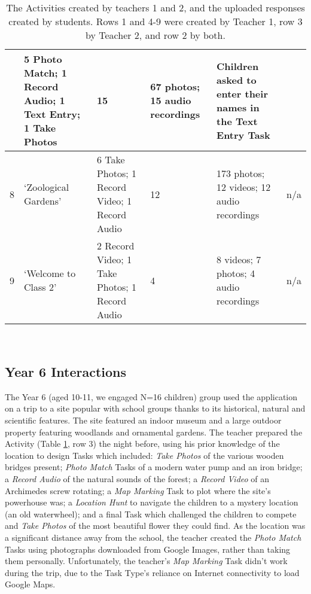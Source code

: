\begin{table}[]
\begin{tabularx}{\linewidth}{ 
| p{3mm} 
| >{\raggedright\arraybackslash}X 
| >{\raggedright\arraybackslash}X 
| p{13mm}
| >{\raggedright\arraybackslash}X 
| >{\raggedright\arraybackslash}X 
|}
    & \footnotesize 5 Photo Match; 1 Record Audio; 1 Text Entry; 1 Take Photos
    & \footnotesize 15 
    & \footnotesize 67 photos; 15 audio recordings
    & \footnotesize Children asked to enter their names in the Text Entry Task\\
\hline
    \small 8 
    & \footnotesize `Zoological Gardens' 
    & \footnotesize 6 Take Photos; 1 Record Video; 1 Record Audio
    & \footnotesize 12 
    & \footnotesize 173 photos; 12 videos; 12 audio recordings
    & \footnotesize n/a\\
\hline
    \small 9 
    & \footnotesize `Welcome to Class 2' 
    & \footnotesize 2 Record Video; 1 Take Photos; 1 Record Audio
    & \footnotesize 4 
    & \footnotesize 8 videos; 7 photos; 4 audio recordings
    & \footnotesize n/a\\
\hline
\end{tabularx}
    \caption[The Activities created by teachers 1 and 2, and the uploaded responses created by students.]{The Activities created by teachers 1 and 2, and the uploaded responses created by students. Rows 1 and 4-9 were created by Teacher 1, row 3 by Teacher 2, and row 2 by both.}~\label{tab:TeacherActivities}
\end{table}

\subsection{Year 6 Interactions}

The Year 6 (aged 10-11, we engaged N=16 children) group used the application on a trip to a site popular with school groups thanks to its historical, natural and scientific features. The site featured an indoor museum and a large outdoor property featuring woodlands and ornamental gardens. The teacher prepared the Activity (Table \ref{tab:TeacherActivities}, row 3) the night before, using his prior knowledge of the location to design Tasks which included: \textit{Take Photos} of the various wooden bridges present; \textit{Photo Match} Tasks of a modern water pump and an iron bridge; a \textit{Record Audio} of the natural sounds of the forest; a \textit{Record Video} of an Archimedes screw rotating; a \textit{Map Marking} Task to plot where the site's powerhouse was; a \textit{Location Hunt} to navigate the children to a mystery location (an old waterwheel); and a final Task which challenged the children to compete and \textit{Take Photos} of the most beautiful flower they could find. As the location was a significant distance away from the school, the teacher created the \textit{Photo Match} Tasks using photographs downloaded from Google Images, rather than taking them personally. Unfortunately, the teacher's \textit{Map Marking} Task didn't work during the trip, due to the Task Type's reliance on Internet connectivity to load Google Maps.

